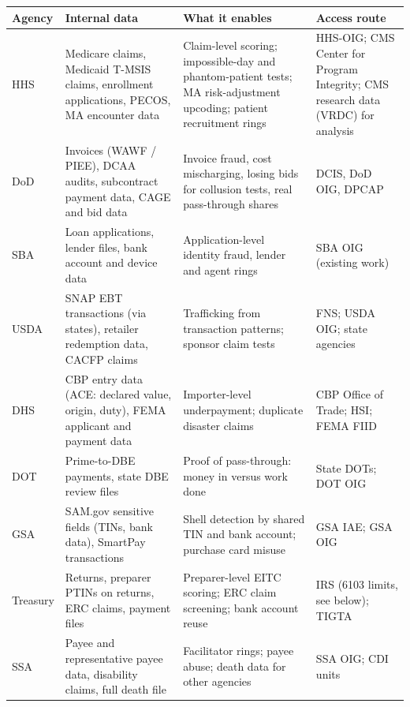 \documentclass[letterpaper,11pt]{article}
\begin{document}
\begingroup\small\setlength{\tabcolsep}{4pt}\renewcommand{\arraystretch}{1.25}
\begin{longtable}[l]{@{}>{\raggedright\arraybackslash}p{}>{\raggedright\arraybackslash}p{}>{\raggedright\arraybackslash}p{}>{\raggedright\arraybackslash}p{}@{}}
\rowcolor{coolblack}\leavevmode\color{white}\bfseries Agency & \leavevmode\color{white}\bfseries Internal data & \leavevmode\color{white}\bfseries What it enables & \leavevmode\color{white}\bfseries Access route \\
\endhead
HHS & Medicare claims, Medicaid T-MSIS claims, enrollment applications, PECOS, MA encounter data & Claim-level scoring; impossible-day and phantom-patient tests; MA risk-adjustment upcoding; patient recruitment rings & HHS-OIG; CMS Center for Program Integrity; CMS research data (VRDC) for analysis \\
DoD & Invoices (WAWF / PIEE), DCAA audits, subcontract payment data, CAGE and bid data & Invoice fraud, cost mischarging, losing bids for collusion tests, real pass-through shares & DCIS, DoD OIG, DPCAP \\
SBA & Loan applications, lender files, bank account and device data & Application-level identity fraud, lender and agent rings & SBA OIG (existing work) \\
USDA & SNAP EBT transactions (via states), retailer redemption data, CACFP claims & Trafficking from transaction patterns; sponsor claim tests & FNS; USDA OIG; state agencies \\
DHS & CBP entry data (ACE: declared value, origin, duty), FEMA applicant and payment data & Importer-level underpayment; duplicate disaster claims & CBP Office of Trade; HSI; FEMA FIID \\
DOT & Prime-to-DBE payments, state DBE review files & Proof of pass-through: money in versus work done & State DOTs; DOT OIG \\
GSA & SAM.gov sensitive fields (TINs, bank data), SmartPay transactions & Shell detection by shared TIN and bank account; purchase card misuse & GSA IAE; GSA OIG \\
Treasury & Returns, preparer PTINs on returns, ERC claims, payment files & Preparer-level EITC scoring; ERC claim screening; bank account reuse & IRS (6103 limits, see below); TIGTA \\
SSA & Payee and representative payee data, disability claims, full death file & Facilitator rings; payee abuse; death data for other agencies & SSA OIG; CDI units \\

\end{longtable}
\end{document}
